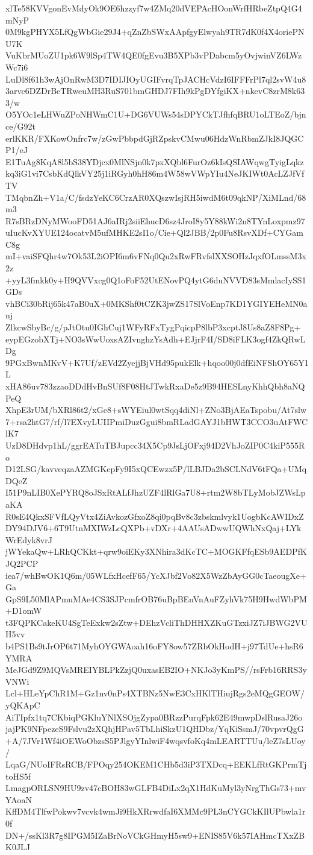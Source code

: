 xlTe58KVVgonEvMdyOk9OE6hzzyf7w4ZMq20dVEPAcHOonWrfHRbeZtpQ4G4mNyP
0M9kgPHYX5LfQgWbGie29J4+qZnZbSWxAApfgyElwyah9TR7dK0f4X4oriePNU7K
VuKbrMUoZU1pk6W9lSp4TW4QE0fgEvu3B5XPb3vPDabcm5yOvjwinVZ6LWzWc7i6
LuDl8f61h3wAjOnRwM3D7IDIJIOyUGIFvrqTpJACHcVdzI6IFFFrPl7ql2svW4u8
3arvc6DZDrBeTRweuMH3RuS701bmGHDJ7FIh9kPgDYfgiKX+nkevC8zrM8k633/w
O5YOc1eLHWuZPoNHWmC1U+DG6VUWs54sDPYCkTJfhfqBRU1oLTEoZ/bjnce/G92t
erlKKR/FXKowOnfrc7w/zGwPbbpdGjRZpskvCMwu06HdzWnRbmZJkI8JQGCP1/eJ
E1TuAg8KqA8l5bS38YDjcx0MlNSjn0k7pxXQbl6FurOz6kIsQSIAWqwgTyigLqkz
kq3iG1vi7CsbKdQlkVY25j1iRGyh0hH86m4W58wVWpYIu4NeJKIWt0AcLZJfVfTV
TMqbnZh+V1a/C/fsdzYeKC6CrzAR0XQszwIsjRH5iwdM6t09qkNP/XiMLnd/68m3
R7sBRzDNyMWooFD51AJ6aIRj2siiEhucD6sz4JroI8y5Y88kWi2n8TYnLoxpmz97
uIucKvXYUE124ocatvM5ufMHKE2sI1o/Cie+Ql2JBB/2p0Fu8RsvXDf+CYGamC8g
mI+vaiSFQhr4w7Ok53L2iOPI6m6vFNq0Qu2xRwFRvfslXXSOHzJqxfOLmssM3x2z
+yyL3fmkk0y+H9QVVxcg0Q1oFoF52UtENovPQ4ytG6duNVVD83sMmlacIySS1GDs
vhBCi30bRij65k47aB0uX+0MKShf0tCZK3jwZS17SlVoEnp7KD1YGIYEHeMN0anj
ZlkcwSbyBc/g/pJtOtu0IGhCuj1WFyRFxTygPqicpP8lbP3xcptJ8Us8aZ8F8Pg+
eypEGzobXTj+NO3sWwUoxsAZIvnghzYsAdh+EJjrF4I/SD8iFLK3ogf4ZkQRwLDg
9PGxBwnMKvV+K7Uf/zEVd2ZyejjBjVHd95pukElk+hqoo00j0dfEiNFShOY65Y1L
xHA86uv783zzaoDDdHvBnSUf8F08HtJTwkRxaDe5z9B94HESLnyKhhQbh8aNQPeQ
XhpE3rUM/bXRl86t2/xGe8+sWYEiul0wtSqq4diNl+ZNo3BjAEaTspobu/At7slw
7+rsa2htG7/rf/l7EXvyLUIIPmiDuzGgui8bmRLadGAYJ1bHWT3CCO3uAtFWClK7
UzD8DHdvp1hL/ggrEATuTBJupcc34X5Cp9JsLjOFxj94D2VhJoZIP0C4kiP555Ro
D12LSG/kavveqzaAZMGKepFy9I5xQCEwzx5P/lLBJDa2bSCLNdV6tFQa+UMqDQeZ
I51P9nLIB0XePYRQ8oJSxRtALfJhzUZF4lRlGa7U8+rtm2W8bTLyMobJZWsLpaKA
R0sE4QkxSFVfLQyVtx4ZiAvkozGfxoZ8qi0pqBv8c3zbskmlvyk1UogbKcAWIDxZ
DY94DJV6+6T9UtnMXIWzLcQXPb+vDXr+4AAUsADwwUQWhNxQaj+LYkWrEdyk8vrJ
jWYekaQw+LRhQCKkt+qrw9oiEKy3XNhira3dKcTC+MOGKFfqESb9AEDPfKJQ2PCP
iea7/whBwOK1Q6m/05WLfxHcefF65/YcXJbf2Vo82X5WzZbAyGG0cTaeougXe+Ga
GpS9L50MlAPmuMAe4CS3SJPcmfrOB76uBpBEnVnAuFZyhVk75H9HwdWbPM+D1omW
t3FQPKCakeKU4SgTeExkw2sZtw+DEhzVcliThDHHXZKuGTzxiJZ7iJBWG2VUH5vv
b4PS1Bs9tJrOP6t71MyhOYGWAoah16oFY8ow57ZRbOkHodH+j97TdUe+hsR6YMRA
MeJGd9Z9MQVsMREIYBLPkZzjQ0uxasEB2IO+NKJo3yKmPS//rsFrb16RRS3yVNWi
Lcl+HLeYpChR1M+Gz1nv0nPs4XTBNz5NwE3CxHKlTHiujRgs2eMQgGEOW/yQKApC
AiTIpfx1tq7CKbiqPGKluYNlXSOjgZypa0BRzzPurqFpk62E49mwpDslRusaJ26o
jajPK9NFpezeS9Fslvu2zXQhjHPav5TbLhiSkzU1QHDbz/YqKiSsmJ/70vpvrQgG
+A/7JVr1Wf4iOEWoObzsS5PJlgyYInlwiF4wqsvfoKq4mLEARTTUu/leZ7sLUoy/
LqaG/NUoIFRsRCB/FPOqy254OKEM1CHb5d3iP3TXDcq+EEKLfRtGKPrmTjtoHS5f
LmagpORLSN9HU9zv47cBOH83wGLFB4DiLx2qX1HdKuMyl3yNrgThGs73+mvYAoaN
KffDM4TlfwPokwv7vcvk4wmJi9HkXRrwdfaI6XMMc9PL3nCYGCkKIlUPbwla1r0f
DN+/ssKl3R7g8IPGM5IZaBrNoVCkGHmyH5sw9+ENIS85V6k57IAHmcTXxZBK0JLJ
